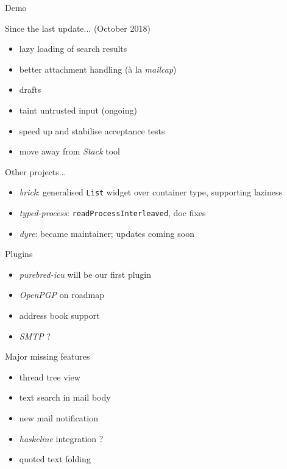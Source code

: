 \documentclass[ignorenonframetext,aspectratio=169,dvipsnames]{beamer}
\begin{document}
\begin{frame}[plain]
\Huge
  Demo
\end{frame}


\begin{frame}{Since the last update... (October 2018)}
    \begin{itemize}
        \item lazy loading of search results
        \item better attachment handling (à la {\em mailcap})
        \item drafts
        \item taint untrusted input (ongoing)
        \item speed up and stabilise acceptance tests
        \item move away from {\em Stack} tool
    \end{itemize}
\end{frame}

\begin{frame}{Other projects...}
    \begin{itemize}
        \item {\em brick}: generalised {\tt List} widget over container
            type, supporting laziness
        \item {\em typed-process}: {\tt readProcessInterleaved}, doc fixes
        \item {\em dyre}: became maintainer; updates coming soon
    \end{itemize}
\end{frame}

\begin{frame}{Plugins}
    \begin{itemize}
        \item {\em purebred-icu} will be our first plugin
        \item {\em OpenPGP} on roadmap
        \item address book support
        \item {\em SMTP} ?
    \end{itemize}
\end{frame}

\begin{frame}{Major missing features}
    \begin{itemize}
        \item thread tree view
        \item text search in mail body
        \item new mail notification
        \item {\em haskeline} integration ? %
        \item quoted text folding
    \end{itemize}
\end{frame}
\end{document}
